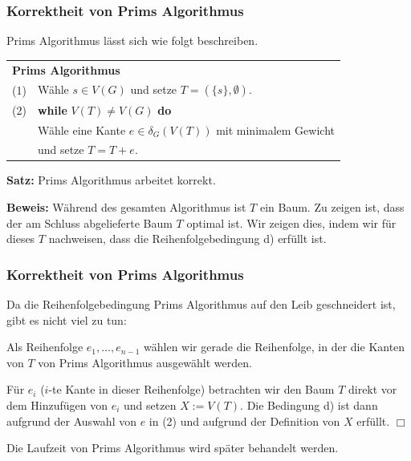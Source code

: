 \documentclass[smaller]{beamer}
\begin{document}
\begin{frame}
 \frametitle{Korrektheit von Prims Algorithmus}
 Prims Algorithmus lässt sich wie folgt beschreiben.

\begin{center}
	\begin{tabular}{rl}
		\multicolumn{2}{l}{\textbf{Prims Algorithmus}} \\
		(1)& Wähle $s \in V(G)$ und setze $T= (\{ s \}, \emptyset)$. \\
		(2)& \textbf{while} $V(T) \neq V(G)$ \textbf{do} \\
		   & \qquad Wähle eine Kante $e \in \delta_G(V(T))$ mit minimalem Gewicht \\
		   & \qquad und setze $T=T+e$.
	\end{tabular}
\end{center}

\textbf{Satz:} Prims Algorithmus arbeitet korrekt. \\ \medskip

\textbf{Beweis:} Während des gesamten Algorithmus ist $T$ ein Baum. Zu zeigen ist, dass der am Schluss abgelieferte Baum $T$ optimal ist. Wir zeigen dies, indem wir für dieses $T$ nachweisen, dass die Reihenfolgebedingung d) erfüllt ist.
\end{frame}

\begin{frame}
 \frametitle{Korrektheit von Prims Algorithmus}
 Da die Reihenfolgebedingung Prims Algorithmus auf den Leib geschneidert ist, gibt es nicht viel zu tun: \\ \medskip
 
 \alert{Als Reihenfolge $e_1,\ldots,e_{n-1}$ wählen wir gerade die Reihenfolge, in der die Kanten von $T$ von Prims Algorithmus ausgewählt werden.} \\ \medskip
 
 Für $e_i$ ($i$-te Kante in dieser Reihenfolge) betrachten wir den Baum $T$ direkt vor dem Hinzufügen von $e_i$ und setzen $X := V(T)$. Die Bedingung d) ist dann aufgrund der Auswahl von $e$ in (2) und aufgrund der Definition von $X$ erfüllt. \qquad $\Box$ \\ \medskip

Die Laufzeit von Prims Algorithmus wird später behandelt werden.
\end{frame}
\end{document}
